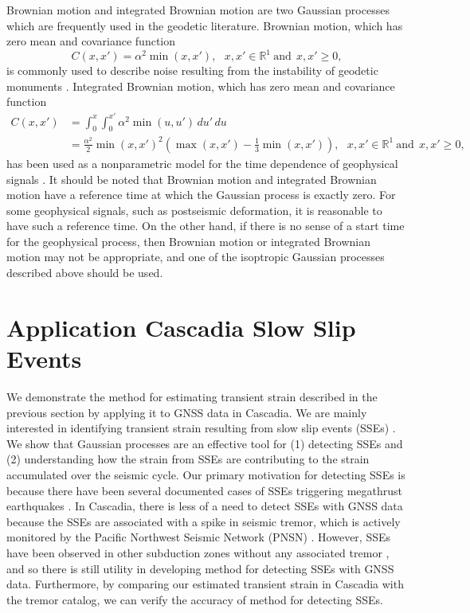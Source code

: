 \documentclass[10pt,a4paper]{article}
\begin{document}
Brownian motion and integrated Brownian motion are two Gaussian processes which are frequently used in the geodetic literature.  Brownian motion, which has zero mean and covariance function
\begin{equation}\label{eq:BM}
C(x,x') =\alpha^2 \min(x,x'), \ \ \ x,x' \in \mathbb{R}^1 \ \mathrm{and} \ \ x,x' \geq 0, 
\end{equation} 
is commonly used to describe noise resulting from the instability of geodetic monuments \citep[e.g.,][]{Wyatt1982,Wyatt1989,Langbein1997}. Integrated Brownian motion, which has zero mean and covariance function
\begin{align}\label{eq:IBM}
C(x,x') &= \int_0^x \int_0^{x'} \alpha^2 \min(u,u') \,du'\,du \\
        &= \frac{\alpha^2}{2}\min(x,x')^2 \left(\max(x,x') - \frac{1}{3}\min(x,x')\right), \ \ \ x,x' \in \mathbb{R}^1 \ \mathrm{and} \ \ x,x' \geq 0,
\end{align}
has been used as a nonparametric model for the time dependence of geophysical signals \citep[e.g.,][]{Segall1997,McGuire2003,Ohtani2010,Hines2016}. It should be noted that Brownian motion and integrated Brownian motion have a reference time at which the Gaussian process is exactly zero. For some geophysical signals, such as postseismic deformation, it is reasonable to have such a reference time. On the other hand, if there is no sense of a start time for the geophysical process, then Brownian motion or integrated Brownian motion may not be appropriate, and one of the isoptropic Gaussian processes described above should be used.

\section{Application Cascadia Slow Slip Events}\label{sec:Cascadia}

We demonstrate the method for estimating transient strain described in the previous section by applying it to GNSS data in Cascadia. We are mainly interested in identifying transient strain resulting from slow slip events (SSEs) \citep[e.g.,][]{Dragert2001}. We show that Gaussian processes are an effective tool for (1) detecting SSEs and (2) understanding how the strain from SSEs are contributing to the strain accumulated over the seismic cycle. Our primary motivation for detecting SSEs is because there have been several documented cases of SSEs triggering megathrust earthquakes \citep{Roeloffs2006}.  In Cascadia, there is less of a need to detect SSEs with GNSS data because the SSEs are associated with a spike in seismic tremor, which is actively monitored by the Pacific Northwest Seismic Network (PNSN) \citep{Wech2010}. However, SSEs have been observed in other subduction zones without any associated tremor \citep{Schwartz2007}, and so there is still utility in developing method for detecting SSEs with GNSS data. Furthermore, by comparing our estimated transient strain in Cascadia with the tremor catalog, we can verify the accuracy of method for detecting SSEs. 
\end{document}
